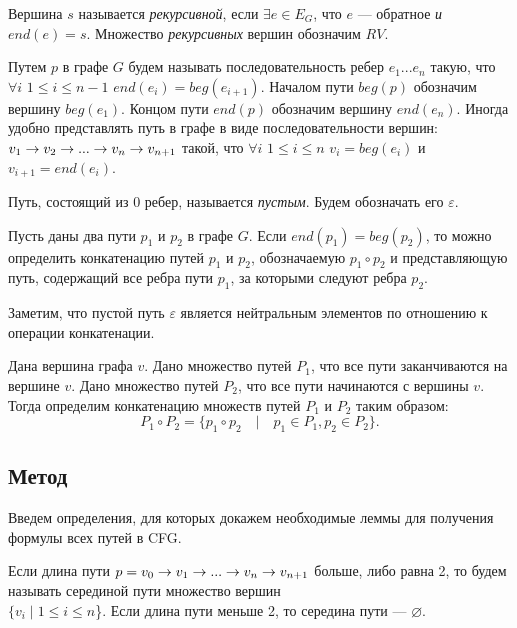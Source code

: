 \begin{defn}\label{recursiveVertex}
Вершина $s$ называется \emph{рекурсивной}, если $\exists e \in E_G$, что $e$ --- обратное \emph{и} $end(e) = s$. 
Множество \emph{рекурсивных} вершин обозначим $RV$.
\end{defn}

\begin{defn}
Путем $p$ в графе $G$ будем называть последовательность ребер $e_1...e_n$ такую,
что $\forall i$ $ 1 \leq i \leq n - 1$ $end(e_i) = beg(e_{i+1})$.
Началом пути $beg(p)$ обозначим вершину $beg(e_1)$.
Концом пути $end(p)$ обозначим вершину $end(e_n)$.
Иногда удобно представлять путь в графе в виде последовательности вершин:
$v_1 \rightarrow v_2 \rightarrow ... \rightarrow v_n \rightarrow v_{n + 1}$ такой, что $\forall i$ $1 \leq i \leq n$ $v_i = beg(e_i)$ и $v_{i+1} = end(e_i)$.
\end{defn}

\begin{defn}
Путь, состоящий из 0 ребер, называется \emph{пустым}.
Будем обозначать его $\varepsilon$.
\end{defn}

\begin{defn}
Пусть даны два пути $p_1$ и $p_2$ в графе $G$.
Если $end(p_1) = beg(p_2)$, то можно определить конкатенацию путей $p_1$ и $p_2$, обозначаемую $p_1 \circ p_2$ и представляющую путь, содержащий все ребра пути $p_1$, за которыми следуют ребра $p_2$.

Заметим, что пустой путь $\varepsilon$ является нейтральным элементов по отношению к операции конкатенации.
\end{defn}

\begin{defn}
Дана вершина графа $v$.
Дано множество путей $P_1$, что все пути заканчиваются на вершине $v$.
Дано множество путей $P_2$, что все пути начинаются с вершины $v$.
Тогда определим конкатенацию множеств путей $P_1$ и $P_2$ таким образом:
$$P_1 \circ P_2 = \{p_1 \circ p_2 \quad | \quad p_1 \in P_1, p_2 \in P_2 \}.$$
\end{defn}

\subsection{Метод}
Введем определения, для которых докажем необходимые леммы для получения формулы всех путей в CFG.


\begin{defn}
Если длина пути $p = v_0 \rightarrow v_1 \rightarrow ... \rightarrow v_n \rightarrow v_{n+1}$ больше, либо равна 2, то будем называть серединой пути множество вершин \\
$\{v_i \mid 1 \leq i \leq n$\}. Если длина пути меньше 2, то середина пути --- $\varnothing$.
\end{defn}


